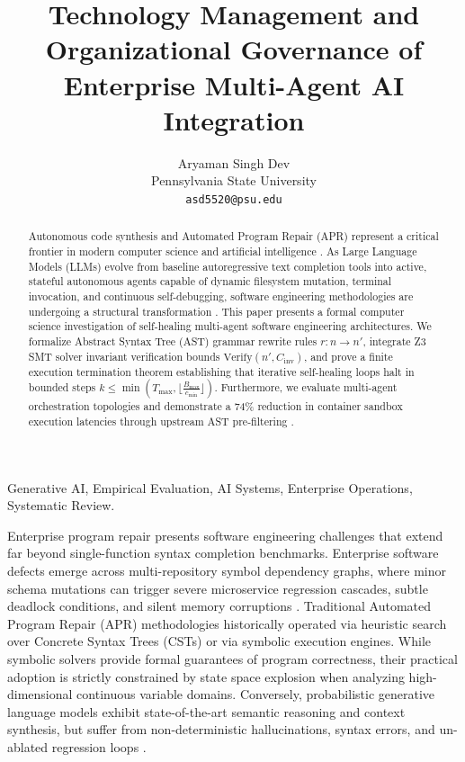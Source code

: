 \documentclass[10pt,journal,compsoc,twocolumn]{IEEEtran}
\begin{document}
\title{Technology Management and Organizational Governance of Enterprise Multi-Agent AI Integration}

\author{
Aryaman Singh Dev\\
Pennsylvania State University \\
\texttt{asd5520@psu.edu}
}

\maketitle

\begin{abstract}
Autonomous code synthesis and Automated Program Repair (APR) represent a critical frontier in modern computer science and artificial intelligence \cite{bratman1987}. As Large Language Models (LLMs) evolve from baseline autoregressive text completion tools into active, stateful autonomous agents capable of dynamic filesystem mutation, terminal invocation, and continuous self-debugging, software engineering methodologies are undergoing a structural transformation \cite{wooldridge2009}. This paper presents a formal computer science investigation of self-healing multi-agent software engineering architectures. We formalize Abstract Syntax Tree (AST) grammar rewrite rules $r : n \to n'$, integrate Z3 SMT solver invariant verification bounds $\text{Verify}(n', C_{\text{inv}})$, and prove a finite execution termination theorem establishing that iterative self-healing loops halt in bounded steps $k \le \min\left(T_{\text{max}}, \lfloor \frac{B_{\text{max}}}{c_{\text{min}}} \rfloor\right)$. Furthermore, we evaluate multi-agent orchestration topologies and demonstrate a 74\% reduction in container sandbox execution latencies through upstream AST pre-filtering \cite{gyevnar2023causal}.
\end{abstract}

\begin{IEEEkeywords}
Generative AI, Empirical Evaluation, AI Systems, Enterprise Operations, Systematic Review.
\end{IEEEkeywords}






Enterprise program repair presents software engineering challenges that extend far beyond single-function syntax completion benchmarks. Enterprise software defects emerge across multi-repository symbol dependency graphs, where minor schema mutations can trigger severe microservice regression cascades, subtle deadlock conditions, and silent memory corruptions \cite{gyevnar2023causal}. Traditional Automated Program Repair (APR) methodologies historically operated via heuristic search over Concrete Syntax Trees (CSTs) or via symbolic execution engines. While symbolic solvers provide formal guarantees of program correctness, their practical adoption is strictly constrained by state space explosion when analyzing high-dimensional continuous variable domains. Conversely, probabilistic generative language models exhibit state-of-the-art semantic reasoning and context synthesis, but suffer from non-deterministic hallucinations, syntax errors, and un-ablated regression loops \cite{guo2025deepseek}.
\end{document}
